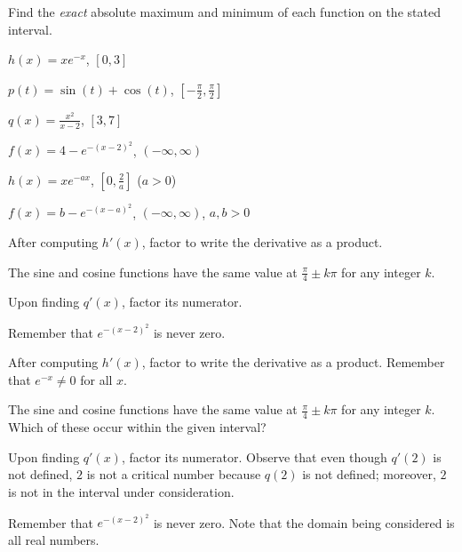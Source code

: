 \begin{activity} \label{A:3.3.2}  Find the \emph{exact} absolute maximum and minimum of each function on the stated interval.
	\ba
	\item $h(x) = xe^{-x}$, $[0,3]$
	\item $p(t) = \sin(t) + \cos(t)$, $[-\frac{\pi}{2}, \frac{\pi}{2}]$
	\item $q(x) = \frac{x^2}{x-2}$, $[3,7]$
	\item $f(x) = 4 - e^{-(x-2)^2}$, $(-\infty, \infty)$
	\item $h(x) =  xe^{-ax}$, $[0, \frac{2}{a}]$ ($a > 0$)
	\item $f(x) = b - e^{-(x-a)^2}$, $(-\infty, \infty)$, $a, b > 0$
	\ea
\end{activity}
\begin{smallhint}
\ba
	\item After computing $h'(x)$, factor to write the derivative as a product.
	\item The sine and cosine functions have the same value at $\frac{\pi}{4} \pm k\pi$ for any integer $k$.
	\item Upon finding $q'(x)$, factor its numerator.
	\item Remember that $e^{-(x-2)^2}$ is never zero.
\ea
\end{smallhint}
\begin{bighint}
\ba
	\item After computing $h'(x)$, factor to write the derivative as a product.  Remember that $e^{-x} \ne 0$ for all $x$.
	\item The sine and cosine functions have the same value at $\frac{\pi}{4} \pm k\pi$ for any integer $k$.  Which of these occur within the given interval?
	\item Upon finding $q'(x)$, factor its numerator.  Observe that even though $q'(2)$ is not defined, $2$ is not a critical number because $q(2)$ is not defined; moreover, $2$ is not in the interval under consideration.
	\item Remember that $e^{-(x-2)^2}$ is never zero.  Note that the domain being considered is all real numbers.
\ea
\end{bighint}

